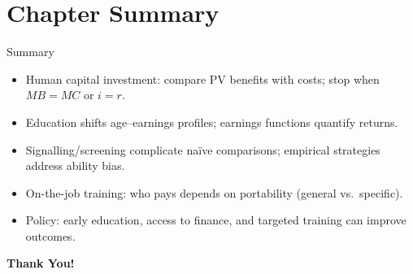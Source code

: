 \documentclass[aspectratio=169]{beamer}
\begin{document}
\section{Chapter Summary}

\begin{frame}{Summary}
\transfade
\begin{itemize}[<+->]
  \item Human capital investment: compare PV benefits with costs; stop when \(MB=MC\) or \(i=r\).
  \item Education shifts age–earnings profiles; earnings functions quantify returns.
  \item Signalling/screening complicate naïve comparisons; empirical strategies address ability bias.
  \item On-the-job training: who pays depends on portability (general vs.\ specific).
  \item Policy: early education, access to finance, and targeted training can improve outcomes.
\end{itemize}
\end{frame}

\begin{frame}
\centering
\Huge{\textbf{Thank You!}} \\

\end{frame}
\end{document}

